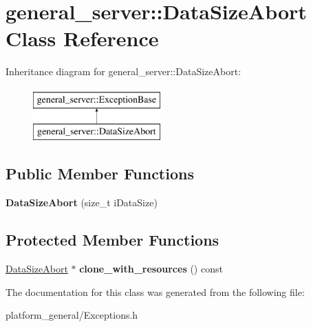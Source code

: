 \hypertarget{classgeneral__server_1_1DataSizeAbort}{\section{general\-\_\-server\-:\-:\-Data\-Size\-Abort \-Class \-Reference}
\label{classgeneral__server_1_1DataSizeAbort}
}
\-Inheritance diagram for general\-\_\-server\-:\-:\-Data\-Size\-Abort\-:\begin{figure}[H]
\begin{center}
\leavevmode
\includegraphics[height=2.000000cm]{classgeneral__server_1_1DataSizeAbort}
\end{center}
\end{figure}
\subsection*{\-Public \-Member \-Functions}
\begin{DoxyCompactItemize}
\item 
\hypertarget{classgeneral__server_1_1DataSizeAbort_a301ef3d74a5d82230f6634ebcd46831c}{{\bfseries \-Data\-Size\-Abort} (size\-\_\-t i\-Data\-Size)}\label{classgeneral__server_1_1DataSizeAbort_a301ef3d74a5d82230f6634ebcd46831c}

\end{DoxyCompactItemize}
\subsection*{\-Protected \-Member \-Functions}
\begin{DoxyCompactItemize}
\item 
\hypertarget{classgeneral__server_1_1DataSizeAbort_a195589380c6b21d4ba44d23a9abd3309}{\hyperlink{classgeneral__server_1_1DataSizeAbort}{\-Data\-Size\-Abort} $\ast$ {\bfseries clone\-\_\-with\-\_\-resources} () const }\label{classgeneral__server_1_1DataSizeAbort_a195589380c6b21d4ba44d23a9abd3309}

\end{DoxyCompactItemize}


\-The documentation for this class was generated from the following file\-:\begin{DoxyCompactItemize}
\item 
platform\-\_\-general/\-Exceptions.\-h\end{DoxyCompactItemize}
